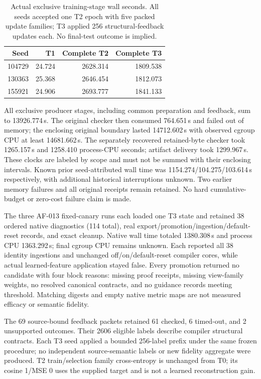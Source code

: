 \documentclass{article}
\begin{document}
\begin{table}[h]
\centering\small
\caption{Actual exclusive training-stage wall seconds. All seeds accepted one T2 epoch with five packed update families; T3 applied 256 structural-feedback updates each. No final-test outcome is implied.}
\begin{tabular}{rrrr}\toprule
Seed & T1 & Complete T2 & Complete T3 \\\midrule
104729 & 24.724 & 2628.314 & 1809.538 \\
130363 & 25.368 & 2646.454 & 1812.073 \\
155921 & 24.906 & 2693.777 & 1841.133 \\\bottomrule
\end{tabular}
\end{table}
All exclusive producer stages, including common preparation and feedback, sum to 13926.774\,s. The original checker then consumed 764.651\,s and failed out of memory; the enclosing original boundary lasted 14712.602\,s with observed cgroup CPU at least 14681.662\,s. The separately recovered retained-byte checker took 1265.157\,s and 1258.410 process-CPU seconds; artifact delivery took 1299.967\,s. These clocks are labeled by scope and must not be summed with their enclosing intervals. Known prior seed-attributed wall time was 1154.274/104.275/103.614\,s respectively, with additional historical interruptions unknown. Two earlier memory failures and all original receipts remain retained. No hard cumulative-budget or zero-cost failure claim is made.

The three AF-013 fixed-canary runs each loaded one T3 state and retained 38 ordered native diagnostics (114 total), real export/promotion/ingestion/default-reset records, and exact cleanup. Native wall time totaled 1380.308\,s and process CPU 1363.292\,s; final cgroup CPU remains unknown. Each reported all 38 identity ingestions and unchanged off/on/default-reset compiler cores, while actual learned-feature application stayed false. Every promotion returned no candidate with four block reasons: missing proof receipts, missing view-family weights, no resolved canonical contracts, and no guidance records meeting threshold. Matching digests and empty native metric maps are not measured efficacy or semantic fidelity.

The 69 source-bound feedback packets retained 61 checked, 6 timed-out, and 2 unsupported outcomes. Their 2606 eligible labels describe compiler structural contracts. Each T3 seed applied a bounded 256-label prefix under the same frozen procedure; no independent source-semantic labels or new fidelity aggregate were produced. T2 train/selection family cross-entropy is unchanged from T0; its cosine 1/MSE 0 uses the supplied target and is not a learned reconstruction gain.
\end{document}
